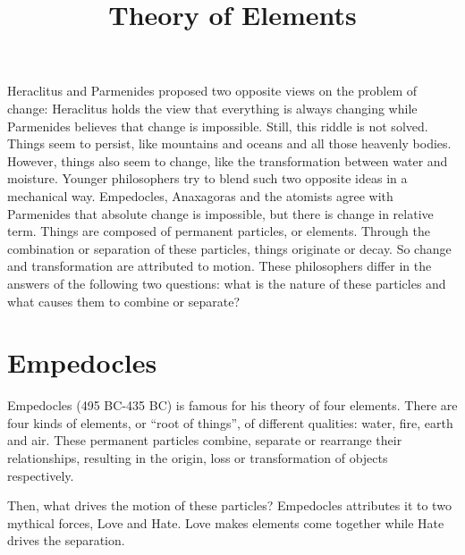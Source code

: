 \documentclass[11pt]{article}
\title{Theory of Elements}
\date{}
\begin{document}
  \maketitle

  \linenumbers

Heraclitus and Parmenides proposed two opposite views on the problem of change: 
Heraclitus holds the view that everything is always changing while Parmenides believes that change is impossible. 
Still, this riddle is not solved. 
Things seem to persist, like mountains and oceans and all those heavenly bodies. 
However, things also seem to change, like the transformation between water and moisture. 
Younger philosophers try to blend such two opposite ideas in a mechanical way. 
Empedocles, Anaxagoras and the atomists agree with Parmenides that absolute change is impossible, but there is change in relative term. 
Things are composed of permanent particles, or elements. 
Through the combination or separation of these particles, things originate or decay. 
So change and transformation are attributed to motion. 
These philosophers differ in the answers of the following two questions: what is the nature of these particles and what causes them to combine or separate? 

\section{Empedocles}
Empedocles (495 BC-435 BC) is famous for his theory of four elements. 
There are four kinds of elements, or “root of things”, of different qualities: 
water, fire, earth and air. 
These permanent particles combine, separate or rearrange their relationships, resulting in the origin, loss or transformation of objects respectively.

\newline

Then, what drives the motion of these particles? 
Empedocles attributes it to two mythical forces, Love and Hate. 
Love makes elements come together while Hate drives the separation. 

\newline
\end{document}
